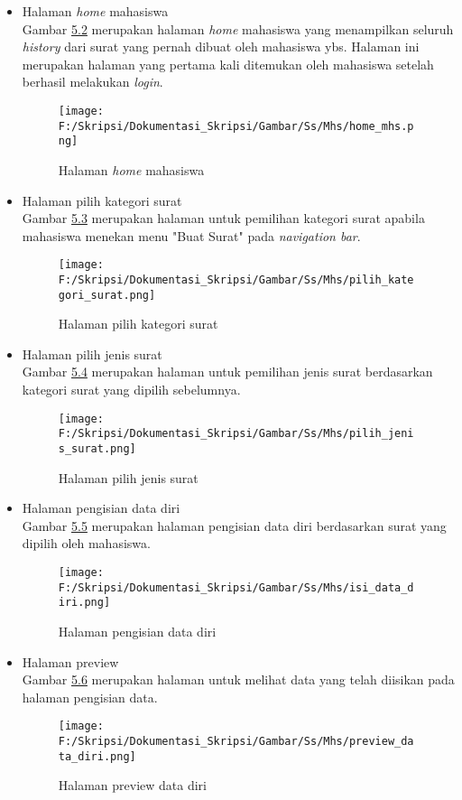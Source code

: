 \begin{itemize}
	\item Halaman \textit{home} mahasiswa\\
	 Gambar \hyperlink{halaman_home_mahasiswa}{5.2} merupakan halaman \textit{home} mahasiswa yang menampilkan seluruh \textit{history} dari surat yang pernah dibuat oleh mahasiswa ybs. Halaman ini merupakan halaman yang pertama kali ditemukan oleh mahasiswa setelah berhasil melakukan \textit{login}.
	 \begin{figure}[H]
	\centering
		\texttt{[image: F:/Skripsi/Dokumentasi\_Skripsi/Gambar/Ss/Mhs/home\_mhs.png]}
		\caption{Halaman \textit{home} mahasiswa}
		\label{fig:halaman_home_mahasiswa}
	\end{figure}
	
	\item Halaman pilih kategori surat\\
	Gambar \hyperlink{halaman_pilih_kategori_surat}{5.3} merupakan halaman untuk pemilihan kategori surat apabila mahasiswa menekan menu "Buat Surat" pada \textit{navigation bar}.
	\begin{figure}[H]
	\centering
		\texttt{[image: F:/Skripsi/Dokumentasi\_Skripsi/Gambar/Ss/Mhs/pilih\_kategori\_surat.png]}
		\caption{Halaman pilih kategori surat}
		\label{fig:halaman_pilih_kategori_surat}
	\end{figure}
	
	 \item Halaman pilih jenis surat\\
	Gambar \hyperlink{halaman_pilih_jenis_surat}{5.4} merupakan halaman untuk pemilihan jenis surat berdasarkan kategori surat yang dipilih sebelumnya.
	\begin{figure}[H]
	\centering
		\texttt{[image: F:/Skripsi/Dokumentasi\_Skripsi/Gambar/Ss/Mhs/pilih\_jenis\_surat.png]}
		\caption{Halaman pilih jenis surat}
		\label{fig:halaman_pilih_jenis_surat}
	\end{figure}
	
	\item Halaman pengisian data diri\\
	Gambar \hyperlink{halaman_pengisian_data_diri}{5.5} merupakan halaman pengisian data diri berdasarkan surat yang dipilih oleh mahasiswa.
	\begin{figure}[H]
	\centering
		\texttt{[image: F:/Skripsi/Dokumentasi\_Skripsi/Gambar/Ss/Mhs/isi\_data\_diri.png]}
		\caption{Halaman pengisian data diri}
		\label{fig:halaman_pengisian_data_diri}
	\end{figure}
	
	\item Halaman preview\\
	Gambar \hyperlink{halaman_preview_data_diri}{5.6} merupakan halaman untuk melihat data yang telah diisikan pada halaman pengisian data.
	\begin{figure}[H]
	\centering
		\texttt{[image: F:/Skripsi/Dokumentasi\_Skripsi/Gambar/Ss/Mhs/preview\_data\_diri.png]}
		\caption{Halaman preview data diri}
		\label{fig:halaman_preview_data_diri}
	\end{figure}
\end{itemize}

